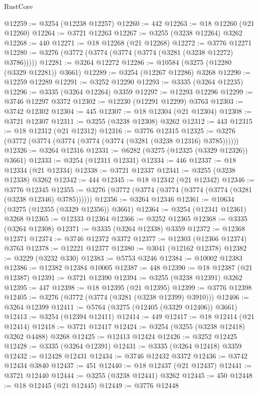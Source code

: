 \begin{lexlean}{RustCore}
\begin{coremodule}
@12259 := @3254 (@12238 @12257)
@12260 := 442
@12263 := @18 @12260 (@21 @12260)
@12264 := @3721 @12263
@12267 := @3255 (@3238 @12264) @3262
@12268 := 440
@12271 := @18 @12268 (@21 @12268)
@12272 := @3776 @12271
@12280 := @3276 (@3772 (@3774 (@3774 (@3774 (@3281 (@3238 @12272) @3786)))))
@12281 := @3264 @12272
@12286 := @10584 (@3275 (@12280 (@3329 @12281)) @3661)
@12289 := @3254 (@12267 @12286) @3268
@12290 := @12259 @12289
@12291 := @3252 @12290
@12293 := @3335 (@3264 @12235)
@12296 := @3335 (@3264 @12264) @3359
@12297 := @12293 @12296
@12299 := @3746 @12297 @3372
@12302 := @12230 (@12291 @12299) @3763
@12303 := @3742 @12302
@12304 := 445
@12307 := @18 @12304 (@21 @12304)
@12308 := @3721 @12307
@12311 := @3255 (@3238 @12308) @3262
@12312 := 443
@12315 := @18 @12312 (@21 @12312)
@12316 := @3776 @12315
@12325 := @3276 (@3772 (@3774 (@3774 (@3774 (@3774 (@3281 (@3238 @12316) @3785))))))
@12326 := @3264 @12316
@12331 := @6282 (@3275 (@12325 (@3329 @12326)) @3661)
@12333 := @3254 (@12311 @12331)
@12334 := 446
@12337 := @18 @12334 (@21 @12334)
@12338 := @3721 @12337
@12341 := @3255 (@3238 @12338) @3262
@12342 := 444
@12345 := @18 @12342 (@21 @12342)
@12346 := @3776 @12345
@12355 := @3276 (@3772 (@3774 (@3774 (@3774 (@3774 (@3281 (@3238 @12346) @3785))))))
@12356 := @3264 @12346
@12361 := @10634 (@3275 (@12355 (@3329 @12356)) @3661)
@12364 := @3254 (@12341 @12361) @3268
@12365 := @12333 @12364
@12366 := @3252 @12365
@12368 := @3335 (@3264 @12308)
@12371 := @3335 (@3264 @12338) @3359
@12372 := @12368 @12371
@12374 := @3746 @12372 @3372
@12377 := @12303 (@12366 @12374) @3763
@12378 := @12221 @12377
@12380 := @3041 (@12162 @12378)
@12382 := @3229 (@3232 @330)
@12383 := @5753 @3246
@12384 := @10002 @12383
@12386 := @12382 @12384 @10005
@12387 := 448
@12390 := @18 @12387 (@21 @12387)
@12391 := @3721 @12390
@12394 := @3255 (@3238 @12391) @3262
@12395 := 447
@12398 := @18 @12395 (@21 @12395)
@12399 := @3776 @12398
@12405 := @3276 (@3772 (@3774 (@3281 (@3238 @12399) @3910)))
@12406 := @3264 @12399
@12411 := @5764 (@3275 (@12405 (@3329 @12406)) @3661)
@12413 := @3254 (@12394 @12411)
@12414 := 449
@12417 := @18 @12414 (@21 @12414)
@12418 := @3721 @12417
@12424 := @3254 (@3255 (@3238 @12418) @3262 @4488) @3268
@12425 := @12413 @12424
@12426 := @3252 @12425
@12428 := @3335 (@3264 @12391)
@12431 := @3335 (@3264 @12418) @3359
@12432 := @12428 @12431
@12434 := @3746 @12432 @3372
@12436 := @3742 @12434 @3840
@12437 := 451
@12440 := @18 @12437 (@21 @12437)
@12441 := @3721 @12440
@12444 := @3255 (@3238 @12441) @3262
@12445 := 450
@12448 := @18 @12445 (@21 @12445)
@12449 := @3776 @12448

\end{coremodule}
\end{lexlean}
